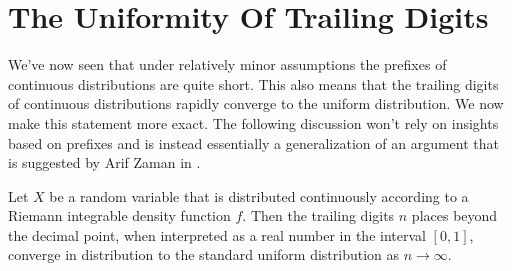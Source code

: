 \section{The Uniformity Of Trailing Digits}

We've now seen that under relatively minor assumptions the prefixes of continuous distributions are quite short. This also means that the trailing digits of continuous distributions rapidly converge to the uniform distribution. We now make this statement more exact. The following discussion won't rely on insights based on prefixes and is instead essentially a generalization of an argument that is suggested by Arif Zaman in \cite{Zaman}.

\begin{theorem}
	Let $X$ be a random variable that is distributed continuously according to a Riemann integrable density function $f$. Then the trailing digits $n$ places beyond the decimal point, when interpreted as a real number in the interval $[0,1]$, converge in distribution to the standard uniform distribution as $n\rightarrow\infty$.
\end{theorem}
